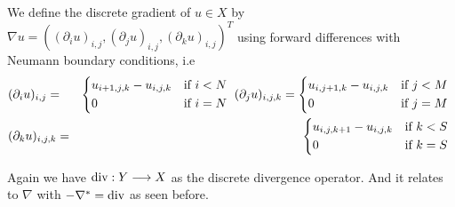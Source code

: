     \begin{definition} %
    \label{def:discrete_gradient_operator_ms}

        We define the discrete gradient of $u \in X$ by $\nabla u = ((\partial_{i}u)_{i, j}, (\partial_{j}u)_{i, j}, (\partial_{k}u)_{i, j})^{T}$ using forward differences with Neumann boundary conditions, i.e
            \begin{eqnarray}
                &(\partial_{i}u)_{i, j} =&
                    \begin{dcases*}
                        u_{i+1, j, k} - u_{i, j, k} & \textnormal{if $i < N$} \\
                        0 & \textnormal{if $i = N$}
                    \end{dcases*}
                \notag
                (\partial_{j}u)_{i, j, k} =
                    \begin{dcases*}
                        u_{i, j+1, k} - u_{i, j, k} & \textnormal{if $j < M$} \\
                        0 & \textnormal{if $j = M$}
                    \end{dcases*}
                \notag \\
                &(\partial_{k}u)_{i, j, k} =&
                    \begin{dcases*}
                        u_{i, j, k+1} - u_{i, j, k} & \textnormal{if $k < S$} \\
                        0 & \textnormal{if $k = S$}
                    \end{dcases*}
                \notag
            \end{eqnarray}

    \end{definition}

    Again we have $\textnormal{div}: Y \longrightarrow X$ as the discrete divergence operator. And it relates to $\nabla$ with $- \nabla^{\ast} = \textnormal{div}$ as seen before.

